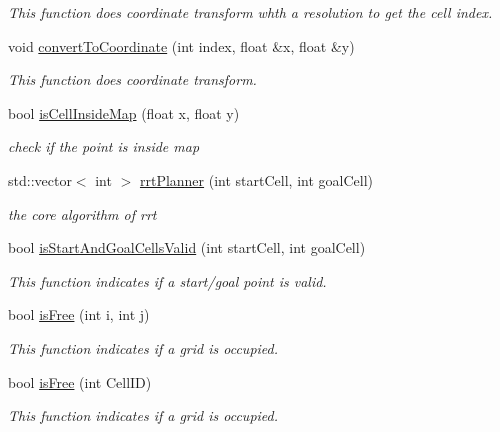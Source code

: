 \begin{DoxyCompactItemize}
\begin{DoxyCompactList}\small\item\em This function does coordinate transform whth a resolution to get the cell index. \end{DoxyCompactList}\item 
void \hyperlink{classrrt__planner_1_1rrtPlannerROS_adcb77afdad88d1d750b11582274b1a25}{convert\+To\+Coordinate} (int index, float \&x, float \&y)
\begin{DoxyCompactList}\small\item\em This function does coordinate transform. \end{DoxyCompactList}\item 
bool \hyperlink{classrrt__planner_1_1rrtPlannerROS_a0cb5c0fb53287fbee672088f57770eb2}{is\+Cell\+Inside\+Map} (float x, float y)
\begin{DoxyCompactList}\small\item\em check if the point is inside map \end{DoxyCompactList}\item 
std\+::vector$<$ int $>$ \hyperlink{classrrt__planner_1_1rrtPlannerROS_a8b0fecf1d9c07149b726e2983b01c44f}{rrt\+Planner} (int start\+Cell, int goal\+Cell)
\begin{DoxyCompactList}\small\item\em the core algorithm of rrt \end{DoxyCompactList}\item 
bool \hyperlink{classrrt__planner_1_1rrtPlannerROS_aee8b528868b043d60e740f909f463de6}{is\+Start\+And\+Goal\+Cells\+Valid} (int start\+Cell, int goal\+Cell)
\begin{DoxyCompactList}\small\item\em This function indicates if a start/goal point is valid. \end{DoxyCompactList}\item 
bool \hyperlink{classrrt__planner_1_1rrtPlannerROS_afda90bbd2bab0a0119346a5ac98bd274}{is\+Free} (int i, int j)
\begin{DoxyCompactList}\small\item\em This function indicates if a grid is occupied. \end{DoxyCompactList}\item 
bool \hyperlink{classrrt__planner_1_1rrtPlannerROS_a69ae9fe95e65fc3baa1e567ab33874a3}{is\+Free} (int Cell\+ID)
\begin{DoxyCompactList}\small\item\em This function indicates if a grid is occupied. \end{DoxyCompactList}\item 

\end{DoxyCompactItemize}
